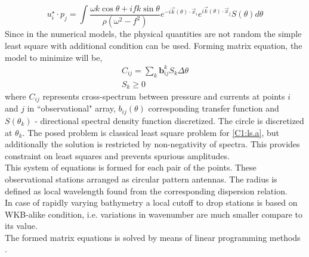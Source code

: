 \begin{equation}
u_i^{\star} \cdot p_j = \int \frac{\omega k \cos \theta + i fk \sin \theta}{\rho(\omega^2 - f^2)} e^{-i \vec{k}(\theta) \cdot \vec{x}_i} e^{i \vec{k}(\theta) \cdot \vec{x}_j}  S(\theta) d \theta
\end{equation}
Since in the numerical models, the physical quantities are not random the simple least square with additional condition can be used. Forming matrix equation, the model to minimize will be,
\begin{subequations}
\begin{align}
C_{ij} = \sum_k \textbf{b}_{ij}^k S_k \Delta \theta \label{C1:ls.a} \\
S_k \geq 0 \label{C1:ls.b}
\end{align}
\end{subequations}
where $C_{ij}$ represents cross-spectrum between pressure and currents at points $i$ and $j$ in ``observational" array, $b_{ij}(\theta)$ corresponding transfer function and $S(\theta_k)$ - directional spectral density function discretized. The circle is discretized at $\theta_k$. The posed problem is classical least square problem for \eqref{C1:ls.a}, but additionally the solution is restricted by non-negativity of spectra. This provides constraint on least squares and prevents spurious amplitudes.\\
This system of equations is formed for each pair of the points. These observational stations arranged as circular pattern antennas. The radius is defined as local wavelength found from the corresponding dispersion relation.\\
In case of rapidly varying bathymetry a local cutoff to drop stations is based on WKB-alike condition, i.e. variations in wavenumber are much smaller compare to its value.\\
The formed matrix equations is solved by means of linear programming methods \cite{haskell1981algorithm}.\\
